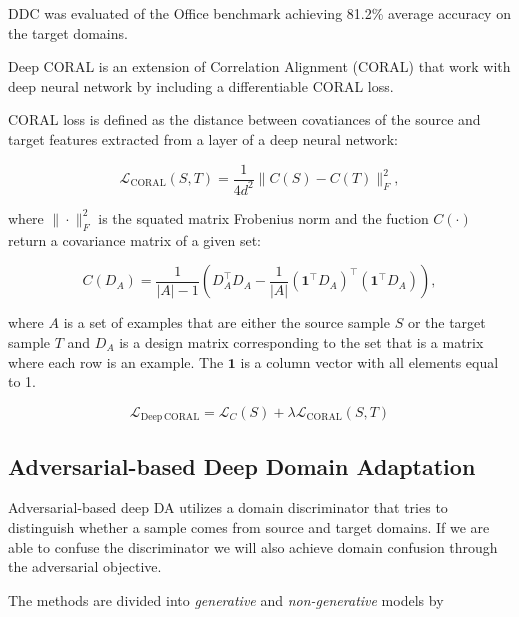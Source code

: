 DDC was evaluated of the Office benchmark achieving 81.2\% average accuracy on the target domains.

Deep CORAL is an extension of Correlation Alignment (CORAL)
that work with deep neural network by including a differentiable CORAL loss.

CORAL loss is defined as the distance between covatiances of the source and target features extracted from a layer of a deep neural network:

\begin{equation}
	\mathcal{L}_{\mathrm{CORAL}}(S, T) = \frac{1}{4 d^2} \|C(S) - C(T)\|_F^2,
	\label{coral_loss}
\end{equation}

where \(\|\cdot\|_F^2\) is the squated matrix Frobenius norm
and the fuction \(C(\cdot)\) return a covariance matrix of a given set:

\begin{equation}
	C(D_A) = \frac{1}{|A| - 1} (D_A^\top D_A
	- \frac{1}{|A|} (\mathbf{1}^\top D_A)^\top (\mathbf{1}^\top D_A)),
	\label{deep_coral_loss}
\end{equation}

where \(A\) is a set of examples
that are either the source sample \(S\) or the target sample \(T\)
and \(D_A\) is a design matrix corresponding to the set
that is a matrix where each row is an example.
The \(\mathbf{1}\) is a column vector with all elements equal to 1.

\begin{equation}
	\mathcal{L}_{\mathrm{Deep\,CORAL}}
	= \mathcal{L}_C(S) + \lambda \mathcal{L}_{\mathrm{CORAL}}(S, T)
\end{equation}

\subsection{Adversarial-based Deep Domain Adaptation}
\label{adversarial_da}

Adversarial-based deep DA utilizes a domain discriminator
that tries to distinguish whether a sample comes from source and target domains.
If we are able to confuse the discriminator
we will also achieve domain confusion through the adversarial objective.

The methods are divided into \textit{generative} and \textit{non-generative}
models by~\cite{wang2018}

